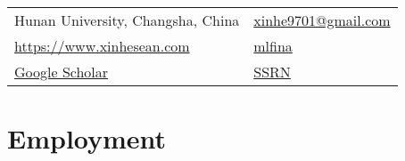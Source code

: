 \documentclass{clean_cv}
\author{Xin He}
\begin{document}
\maketitle
%
\begin{center}
\begin{tabular}{ll}
	 Hunan University, Changsha, China 
	&
	 \href{mailto:xinh@hnu.edu.cn}{ \color{orange} xinhe9701@gmail.com } \\
	 \href{https://www.xinhesean.com}{ \color{orange} https://www.xinhesean.com} 
	&
	  \href{https://github.com/mlfina}{ \color{orange} mlfina}   \\   	
	 \href{https://scholar.google.com/citations?user=qD8bY00AAAAJ&hl=en&authuser=2}{ \color{orange}Google Scholar }
   	&
	 \href{https://papers.ssrn.com/sol3/cf_dev/AbsByAuth.cfm?per_id=3071233}{ \color{orange} SSRN } \\
\end{tabular}
\end{center}

\vspace{-1.5em}


\section{Employment}

\begin{datetabular}{9em}

	
\end{datetabular}
\end{document}
